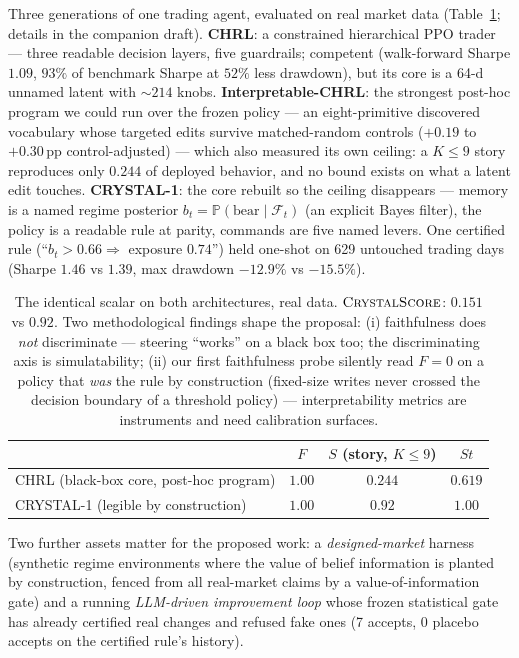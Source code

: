 \documentclass[11pt]{article}
\newcommand{\Prob}{\mathbb{P}}
\begin{document}
Three generations of one trading agent, evaluated on real market data (Table~\ref{tab:prelim};
details in the companion draft). \textbf{CHRL}: a constrained hierarchical PPO trader ---
three readable decision layers, five guardrails; competent (walk-forward Sharpe $1.09$,
$93\%$ of benchmark Sharpe at $52\%$ less drawdown), but its core is a 64-d unnamed latent
with ${\sim}214$ knobs. \textbf{Interpretable-CHRL}: the strongest post-hoc program we could
run over the frozen policy --- an eight-primitive discovered vocabulary whose targeted edits
survive matched-random controls ($+0.19$ to $+0.30$\,pp control-adjusted) --- which also
measured its own ceiling: a $K{\le}9$ story reproduces only $0.244$ of deployed behavior, and
no bound exists on what a latent edit touches. \textbf{CRYSTAL-1}: the core rebuilt so the
ceiling disappears --- memory is a named regime posterior $b_t = \Prob(\text{bear}\mid
\mathcal{F}_t)$ (an explicit Bayes filter), the policy is a readable rule at parity, commands
are five named levers. One certified rule (``$b_t > 0.66 \Rightarrow$ exposure $0.74$'') held
one-shot on 629 untouched trading days (Sharpe $1.46$ vs $1.39$, max drawdown $-12.9\%$ vs
$-15.5\%$).

\begin{table}[h]
\centering\small
\begin{tabular}{lccc}
\toprule
 & $F$ & $S$ (story, $K{\le}9$) & $S\!t$ \\
\midrule
CHRL (black-box core, post-hoc program) & $1.00$ & $0.244$ & $0.619$ \\
CRYSTAL-1 (legible by construction) & $1.00$ & $0.92$ & $1.00$ \\
\bottomrule
\end{tabular}
\caption{The identical scalar on both architectures, real data. $\textsc{CrystalScore}$:
$0.151$ vs $0.92$. Two methodological findings shape the proposal: (i) faithfulness does
\emph{not} discriminate --- steering ``works'' on a black box too; the discriminating axis is
simulatability; (ii) our first faithfulness probe silently read $F{=}0$ on a policy that
\emph{was} the rule by construction (fixed-size writes never crossed the decision boundary of
a threshold policy) --- interpretability metrics are instruments and need calibration
surfaces.}
\label{tab:prelim}
\end{table}

Two further assets matter for the proposed work: a \emph{designed-market} harness (synthetic
regime environments where the value of belief information is planted by construction, fenced
from all real-market claims by a value-of-information gate) and a running \emph{LLM-driven
improvement loop} whose frozen statistical gate has already certified real changes and refused
fake ones (7 accepts, 0 placebo accepts on the certified rule's history).
\end{document}
